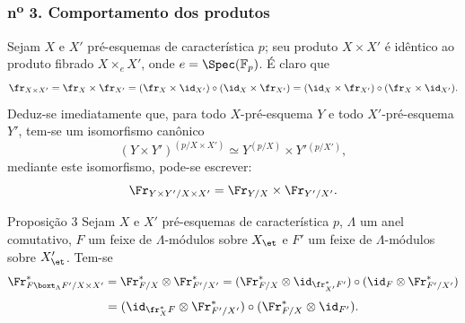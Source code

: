 \subsubsection*{n\textsuperscript{o} 3. Comportamento dos produtos}

Sejam $X$ e $X'$ pré-esquemas de característica $p$; seu produto $X\times X'$ é idêntico ao produto fibrado $X\times_eX'$, onde $e=\Spec(\mathbb F_p)$. É claro que
\[
\fr_{X\times X'}=\fr_X\times\fr_{X'}=(\fr_X\times\id_{X'})\circ(\id_X\times\fr_{X'})
=(\id_X\times\fr_{X'})\circ(\fr_X\times\id_{X'}).
\]
Deduz-se imediatamente que, para todo $X$-pré-esquema $Y$ e todo $X'$-pré-esquema $Y'$, tem-se um isomorfismo canônico
\[
(Y\times Y')^{(p/X\times X')}\simeq Y^{(p/X)}\times Y'{}^{(p/X')},
\]
mediante este isomorfismo, pode-se escrever:
\[
\Fr_{Y\times Y'/X\times X'}=\Fr_{Y/X}\times\Fr_{Y'/X'}.
\]

\begin{statement}{Proposição 3}
Sejam $X$ e $X'$ pré-esquemas de característica $p$, $\Lambda$ um anel comutativo, $F$ um feixe de $\Lambda$-módulos sobre $X_{\et}$ e $F'$ um feixe de $\Lambda$-módulos sobre $X'_{\et}$. Tem-se
\[
\Fr^*_{F\boxt_\Lambda F'/X\times X'}
=\Fr^*_{F/X}\otimes\Fr^*_{F'/X'}
=(\Fr^*_{F/X}\otimes\id_{\fr_{X'}^*F'})\circ
(\id_F\otimes\Fr^*_{F'/X'})
\]
\[
=(\id_{\fr_X^*F}\otimes\Fr^*_{F'/X'})\circ
(\Fr^*_{F/X}\otimes\id_{F'}).
\]
\end{statement}
